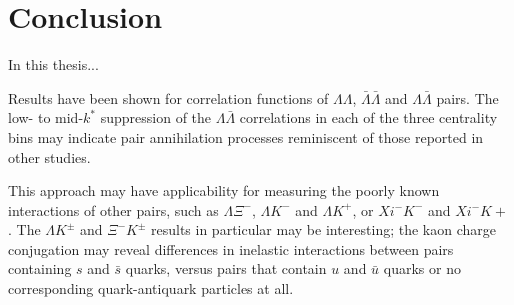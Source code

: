 \section{Conclusion}
\label{sec:Conclusion}

In this thesis...


Results have been shown for correlation functions of $\Lambda\Lambda$, $\bar{\Lambda}\bar{\Lambda}$ and $\Lambda\bar{\Lambda}$ pairs.  
The low- to mid-$k^*$ suppression of the $\Lambda\bar{\Lambda}$ correlations in each of the three centrality bins may indicate pair annihilation processes reminiscent of those reported in other studies.








This approach may have applicability for measuring the poorly known interactions of other pairs, such as $\Lambda\Xi^-$, $\Lambda K^-$ and $\Lambda K^+$, or $Xi^-K^-$ and $Xi^-K+$.
The $\Lambda K^\pm$ and $\Xi^-K^\pm$ results in particular may be interesting; the kaon charge conjugation may reveal differences in inelastic interactions between pairs containing $s$ and $\bar{s}$ quarks, versus pairs that contain $u$ and $\bar{u}$ quarks or no corresponding quark-antiquark particles at all.

